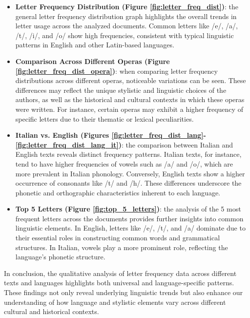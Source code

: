 \begin{itemize}
\item \textbf{Letter Frequency Distribution (Figure \ref{fig:letter_freq_dist})}: the general letter frequency distribution graph highlights the overall trends in letter usage across the analyzed documents. Common letters like /e/, /a/, /t/, /i/, and /o/ show high frequencies, consistent with typical linguistic patterns in English and other Latin-based languages.

\item \textbf{Comparison Across Different Operas (Figure \ref{fig:letter_freq_dist_opera})}: when comparing letter frequency distributions across different operas, noticeable variations can be seen. These differences may reflect the unique stylistic and linguistic choices of the authors, as well as the historical and cultural contexts in which these operas were written. For instance, certain operas may exhibit a higher frequency of specific letters due to their thematic or lexical peculiarities.

\item \textbf{Italian vs. English (Figures \ref{fig:letter_freq_dist_lang}-\ref{fig:letter_freq_dist_lang_it})}: the comparison between Italian and English texts reveals distinct frequency patterns. Italian texts, for instance, tend to have higher frequencies of vowels such as /a/ and /o/, which are more prevalent in Italian phonology. Conversely, English texts show a higher occurrence of consonants like /t/ and /h/. These differences underscore the phonetic and orthographic characteristics inherent to each language.

\item \textbf{Top 5 Letters (Figure \ref{fig:top_5_letters})}: the analysis of the 5 most frequent letters across the documents provides further insights into common linguistic elements. In English, letters like /e/, /t/, and /a/ dominate due to their essential roles in constructing common words and grammatical structures. In Italian, vowels play a more prominent role, reflecting the language's phonetic structure.

\end{itemize}

\noindent In conclusion, the qualitative analysis of letter frequency data across different texts and languages highlights both universal and language-specific patterns. These findings not only reveal underlying linguistic trends but also enhance our understanding of how language and stylistic elements vary across different cultural and historical contexts.

